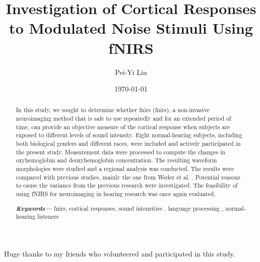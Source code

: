 \documentclass[a4paper, 12pt, twoside]{report}
\author{Pei-Yi Lin}
\title{Investigation of Cortical Responses to Modulated Noise Stimuli Using fNIRS}
\date{\today}
\numberwithin{equation}{section}
\providecommand{\keywords}[1]{\textbf{\textit{Keywords---}} #1}
\begin{document}
\maketitle{}


\begin{abstract}
In this study, we sought to determine whether \acrlong{fnirs} (\acrshort{fnirs}), a non-invasive neuroimaging method that is safe to use repeatedly and for an extended period of time, can provide an objective measure of the cortical response when subjects are exposed to different levels of sound intensity. Eight normal-hearing subjects, including both biological genders and different races, were included and actively participated in the present study. Measurement data were processed to compute the changes in oxyhemoglobin and deoxyhemoglobin concentration. The resulting waveform morphologies were studied and a regional analysis was conducted. The results were compared with previous studies, mainly the one from Weder et al. \citeyearpar{Weder2018}. Potential reasons to cause the variance from the previous research \citep{Weder2018} were investigated. The feasibility of using fNIRS for neuroimaging in hearing research was once again evaluated. \\
\newline

\keywords{ \acrlong{fnirs},	cortical responses,	sound intensities , language processing ,	normal-hearing listeners}

\end{abstract}



\cleardoublepage{}


\begin{acknowledgments}
Huge thanks to my friends who volunteered and participated in this study.
\end{acknowledgments}


% 



\cleardoublepage{}
\tableofcontents
\cleardoublepage{}



%
\end{document}
